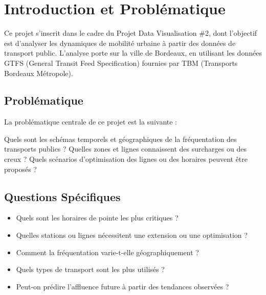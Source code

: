 \documentclass[12pt,a4paper]{article}
\begin{document}
\tableofcontents
\newpage

\section{Introduction et Problématique}

Ce projet s'inscrit dans le cadre du Projet Data Visualisation \#2, dont l'objectif est d'analyser les dynamiques de mobilité urbaine à partir des données de transport public. L'analyse porte sur la ville de Bordeaux, en utilisant les données GTFS (General Transit Feed Specification) fournies par TBM (Transports Bordeaux Métropole).

\subsection{Problématique}

La problématique centrale de ce projet est la suivante :

\begin{infobox}[Problématique]
Quels sont les schémas temporels et géographiques de la fréquentation des transports publics ? Quelles zones et lignes connaissent des surcharges ou des creux ? Quels scénarios d'optimisation des lignes ou des horaires peuvent être proposés ?
\end{infobox}

\subsection{Questions Spécifiques}

\begin{itemize}[leftmargin=2cm]
    \item Quels sont les horaires de pointe les plus critiques ?
    \item Quelles stations ou lignes nécessitent une extension ou une optimisation ?
    \item Comment la fréquentation varie-t-elle géographiquement ?
    \item Quels types de transport sont les plus utilisés ?
    \item Peut-on prédire l'affluence future à partir des tendances observées ?
\end{itemize}
\end{document}
